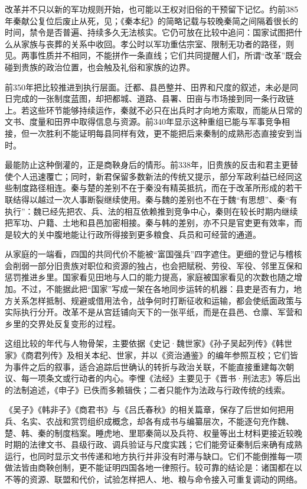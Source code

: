 改革并不只以新的军功规则开始，也可能以王权对旧俗的干预留下记忆。约前385年秦献公复位后废止从死，见；《秦本纪》的简略记载与较晚秦简之间隔着很长的时间，禁令是否普遍、持续多久无法核实。它仍可放在比较中追问：国家试图把什么从家族与丧葬的关系中收回。孝公时以军功重估宗室、限制无功者的路径，则见。两事性质并不相同，不能拼作一条直线；它们共同提醒人们，所谓“改革”既会碰到贵族的政治位置，也会触及礼俗和家族的边界。

前350年把比较推进到执行层面。迁都、县邑整并、田界和尺度的叙述，未必是同日完成的一张制度蓝图，却把都城、道路、县署、田亩与市场接到同一条行政链上。若这些环节能够持续运作，秦就不必只在出兵时才向地方索取，而能从日常的文书、度量和田界中取得信息与资源。前340年显示这种重组已能与军事竞争相接，但一次胜利不能证明每县同样有效，更不能把后来秦制的成熟形态直接安到当时。

最能防止这种倒灌的，正是商鞅身后的情形。前338年，旧贵族的反击和君主更替使个人迅速覆亡；同时，新君保留多数新法的传统又提示，部分军政利益已经同这些制度路径相连。秦与楚的差别不在于秦没有精英抵抗，而在于改革所形成的若干联结得以越过一次人事断裂继续使用。秦与魏的差别也不在于魏“有思想”、秦“有执行”：魏已经先把农、兵、法的相互依赖推到竞争中心，秦则在较长时期内继续把军功、户籍、土地和县邑加密相接。秦与韩的差别，亦不只是官吏更有效率，而是较大的关中腹地能让行政所得接到更多粮食、兵员和可经营的通道。

从家庭的一端看，四国的共同代价不能被“富国强兵”四字遮住。更细的登记与稽核会削弱一部分旧贵族对职位和资源的独占，也会把赋税、劳役、军役、邻里互保和惩罚推进乡里。国家看见田地与人口的能力提高，家庭被国家看见的次数也随之增加。不过，不能据此把“国家”写成一架在各地同步运转的机器：县吏是否有力，地方关系怎样抵制、规避或借用法令，战争何时打断征收和运输，都会使纸面政策与实际执行分开。改革不是从宫廷铺向天下的一张平纸，而是在县邑、仓廪、军营和乡里的交界处反复变形的过程。

\begin{sourcenote}[政策、文本与运行之间的距离]
这组比较的年代与人物骨架，主要依据《史记·魏世家》《孙子吴起列传》《韩世家》《商君列传》及相关本纪、世家，并以《资治通鉴》的编年参照互校；它们皆为事件之后的叙事，适合追踪后世确认的转折与政治关联，不能直接重建每次朝议、每一项条文或行动者的内心。李悝《法经》主要见于《晋书·刑法志》等后出的法制追述，《申子》已佚而多赖辑佚；二者只能作为法政与行政传统的线索。

《吴子》《韩非子》《商君书》与《吕氏春秋》的相关篇章，保存了后世如何把用兵、名实、农战和赏罚组织成概念，却各有成书与编纂层次，不能逐句充作魏、楚、韩、秦的制度档案。睡虎地、里耶秦简以及兵符、权量等出土材料更接近较晚时期的法律文书、县级行政、调兵验证与尺度实践；它们能旁证秦制后来确有成熟运行，也同时显示文书传递和地方执行并非没有时滞与缺口。它们不能倒推每一项做法皆由商鞅创制，更不能证明四国各地一律照行。较可靠的结论是：诸国都在以不等的资源、联盟和代价，试验怎样把人、地、粮与命令接入可重复调动的网络。
\end{sourcenote}

